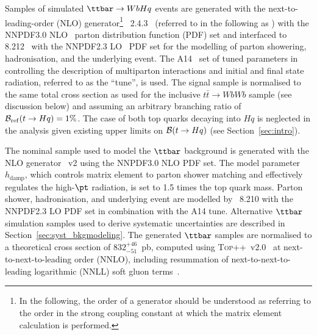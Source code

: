 Samples of simulated $\ttbar \to WbHq$ events are generated with the next-to-leading-order (NLO) generator\footnote{In the following, 
the order of a generator should be understood as referring to the order in the strong coupling constant at which the matrix element calculation 
is performed.} {\amcatnlolong}~2.4.3~\cite{Alwall:2014hca}  (referred to in the following as {\amcatnlo}) with the NNPDF3.0 NLO~\cite{Ball:2014uwa} parton distribution function (PDF) set and interfaced to {\pythia} 8.212~\cite{Sjostrand:2007gs} with the NNPDF2.3 LO~\cite{Ball:2012cx} PDF set for the modelling of parton showering, hadronisation, and the underlying event. 
The A14~\cite{ATLASUETune4} set of tuned parameters in {\pythia} controlling the description of multiparton interactions and  
initial and final state radiation, referred to as the ``tune'', is used.
The signal sample is normalised to the same total cross section as used for the inclusive $t\bar{t}\to WbWb$ sample (see discussion below) and
assuming an arbitrary branching ratio of $\mathcal{B}_{\mathrm{ref}}(t\to Hq)=1\%$.
The case of both top quarks decaying into $Hq$ is neglected in the analysis given existing upper limits on $\mathcal{B}(t \to Hq)$ (see Section~\ref{sec:intro}).

The nominal sample used to model the $\ttbar$ background is generated with the NLO generator {\powheg}~v2 \cite{Frixione:2007nw,Nason:2004rx,Frixione:2007vw,Alioli:2010xd} using the NNPDF3.0 NLO PDF set. The {\powheg} model parameter $h_{\textrm{damp}}$, which controls 
matrix element to parton shower matching and effectively regulates the high-$\pt$ radiation, is set to 1.5 times the top quark mass. 
Parton shower, hadronisation, and underlying event are modelled by {\pythia}~8.210 with the NNPDF2.3 LO PDF set in combination with the A14 tune.
Alternative $\ttbar$ simulation samples used to derive systematic uncertainties are described in Section~\ref{sec:syst_bkgmodeling}. 
The generated $\ttbar$ samples are normalised to a theoretical cross section of $832^{+46}_{-51}$~pb, 
computed using \textsc{Top++}~v2.0~\cite{Czakon:2011xx} at next-to-next-to-leading order (NNLO), 
including resummation of next-to-next-to-leading logarithmic (NNLL) soft gluon 
terms~\cite{Cacciari:2011hy,Baernreuther:2012ws,Czakon:2012zr,Czakon:2012pz,Czakon:2013goa}.

